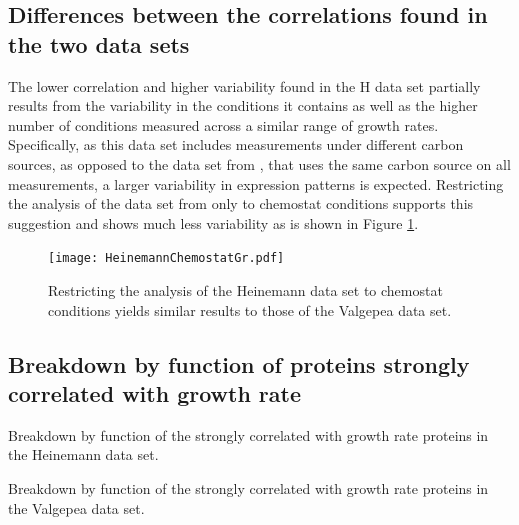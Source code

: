 \documentclass[notitlepage]{article}
\begin{document}
\subsection{Differences between the correlations found in the two data sets}
\label{heinemannchemo}
The lower correlation and higher variability found in the H data set partially results from the variability in the conditions it contains as well as the higher number of conditions measured across a similar range of growth rates.
Specifically, as this data set includes measurements under different carbon sources, as opposed to the data set from \cite{Valgepea2013}, that uses the same carbon source on all measurements, a larger variability in expression patterns is expected.
Restricting the analysis of the data set from \cite{Heinemann2014} only to chemostat conditions supports this suggestion and shows much less variability as is shown in Figure \ref{fig:growthcorrchemo}.

\begin{figure}[h]
\centering
\texttt{[image: HeinemannChemostatGr.pdf]}
\caption{
  Restricting the analysis of the Heinemann data set to chemostat conditions yields similar results to those of the Valgepea data set.
}
\label{fig:growthcorrchemo}
\end{figure}

\subsection{Breakdown by function of proteins strongly correlated with growth rate}
\begin{table}[H]
\centering
\caption{Breakdown by function of the strongly correlated with growth rate proteins in the Heinemann data set.}
\label{tab:corrbreakdownh}
\end{table}

\begin{table}[H]
\centering
\caption{Breakdown by function of the strongly correlated with growth rate proteins in the Valgepea data set.}
\label{tab:corrbreakdownv}
\end{table}
\end{document}
